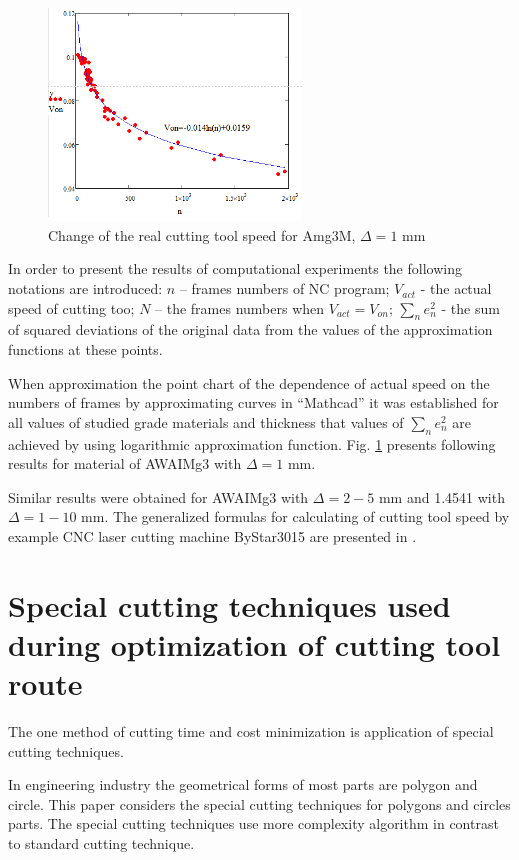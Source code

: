 \documentclass[runningheads]{llncs}
\begin{document}
\begin{figure}
  \begin{center}
  \includegraphics[width=0.6\textwidth]{plot.png}
  \caption{Change of the real cutting tool speed for Amg3M, $\Delta=1$ mm}
  \label{plot}
  \end{center}
\end{figure}

In order to present the results of computational experiments
the following notations are introduced:
$n$ – frames numbers of NC program;
$V_{act}$ - the actual speed of cutting too;
$N$ – the frames numbers when $V_{act}=V_{on}$;
$\sum_n e_n^2$  - the sum of squared deviations of the
original data from the values of the approximation functions at these points.

When approximation the point chart
of the dependence of actual speed
on the numbers of frames by approximating curves in ``Mathcad''
it was established for all values of studied grade materials
and thickness that values of $\sum_n e_n^2$
are achieved by using logarithmic approximation function.
Fig. \ref{plot} presents following results for material of AWAIMg3 with $\Delta=1$ mm.

Similar results were obtained for AWAIMg3 with $\Delta=2-5$ mm
and 1.4541 with $\Delta=1-10$ mm.
The generalized formulas for calculating of cutting tool speed
by example CNC laser cutting machine ByStar3015 are presented in \cite{ru28}.

\section{Special cutting techniques used during optimization of cutting tool route}

The one method of cutting time and cost minimization is application of special cutting techniques.

In engineering industry the geometrical forms of most parts are polygon and circle.
This paper considers the special cutting techniques for polygons and circles parts.
The special cutting techniques use more complexity algorithm in contrast to standard cutting technique.
\end{document}
